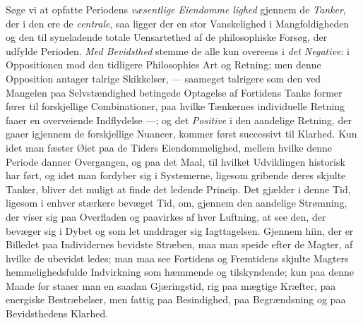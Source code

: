 Søge vi at opfatte Periodens \emph{væsentlige Eiendomme\-%
lighed} gjennem de \emph{Tanker}, der i den ere de \emph{centrale}, saa
ligger der en stor Vanskelighed i Mangfoldigheden og den til\-%
syneladende totale Uensartethed af de philosophiske Forsøg, der
udfylde Perioden. \emph{Med Bevidsthed} stemme de alle kun
overeens i \emph{det Negative}: i Oppositionen mod den tidligere
Philosophies Art og Retning; men denne Opposition antager
talrige Skikkelser, --- saameget talrigere som den ved Mangelen
paa Selvstændighed betingede Optagelse af Fortidens Tanke\-%
former fører til forskjellige Combinationer, paa hvilke Tænkernes
individuelle Retning faaer en overveiende Indflydelse ---; og det
\emph{Positive} i den aandelige Retning, der gaaer igjennem de
forskjellige Nuancer, kommer først successivt til Klarhed. Kun
idet man fæster Øiet paa de Tiders Eiendommelighed, mellem
hvilke denne Periode danner Overgangen, og paa det Maal,
til hvilket Udviklingen historisk har ført, og idet man fordyber
sig i Systemerne, ligesom gribende deres skjulte Tanker, bliver
det muligt at finde det ledende Princip. Det gjælder i denne
Tid, ligesom i enhver stærkere bevæget Tid, om, gjennem den
aandelige Strømning, der viser sig paa Overfladen og paavirkes
af hver Luftning, at see den, der bevæger sig i Dybet og som
let unddrager sig Iagttagelsen. Gjennem hiin, der er Billedet
paa Individernes bevidste Stræben, maa man speide efter de
Magter, af hvilke de ubevidst ledes; man maa see Fortidens og
Fremtidens skjulte Magters hemmelighedsfulde Indvirkning
som hæmmende og tilskyndende; kun paa denne Maade for\-%
staaer man en saadan Gjæringstid, rig paa mægtige Kræfter,
paa energiske Bestræbelser, men fattig paa Besindighed, paa
Begrændsning og paa Bevidsthedens Klarhed.

